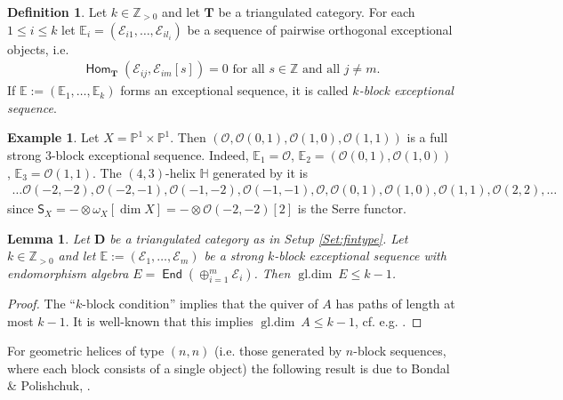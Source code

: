 \documentclass[a4paper,11pt, reqno]{amsart}
\def\E{\mathbb E}
\def\H{\mathbb H}
\def\P{\mathbb P}
\def\Z{\mathbb Z}
\def\DD{\mathbf D}
\def\OO{\mathcal O}
\def\TT{\mathbf T}
\def\sE{\mathscr{E}}
\def\gldim{{\operatorname{gl.dim}\ }}
\newcommand{\opname}[1]{\operatorname{\mathsf{#1}}}
\newcommand{\Hom}{\opname{Hom}}
\newcommand{\End}{\opname{End}}
\newcommand{\bS}{\mathsf{S}}
\theoremstyle{plain}
\newtheorem{lemma}[dummy]{Lemma}
\theoremstyle{definition}
\newtheorem{example}[dummy]{Example}
\newtheorem{definition}[dummy]{Definition}
\numberwithin{equation}{section}
\begin{document}
\begin{definition} \label{D:d-block exceptional sequence}
    Let $k \in \Z_{>0}$ and let $\TT$ be a triangulated category. For each $1 \leq i \leq k$ let $\E_i=(\sE_{i1}, \ldots, \sE_{il_i})$ be a sequence of pairwise orthogonal exceptional objects, i.e. 
    \begin{align}
        \Hom_\TT(\sE_{ij}, \sE_{im}[s])=0 \text{ for all }  s \in \Z \text{ and all } j\neq m.
    \end{align}
 If $\E:=(\E_1, \ldots, \E_k)$ forms an exceptional sequence, it is called \emph{$k$-block exceptional sequence}. 
  \end{definition}

\begin{example}\label{ex:p1xp1}
    Let $X=\P^1 \times \P^1$. Then $\left(\OO, \OO(0, 1), \OO(1, 0), \OO(1, 1)\right)$ is a full strong $3$-block exceptional sequence. Indeed, $\E_1=\OO$, $\E_2=(\OO(0, 1), \OO(1, 0))$, $\E_3=\OO(1, 1)$. The $(4, 3)$-helix $\H$ generated by it is
    \begin{align}
        \ldots \OO(-2, -2), \OO(-2, -1), \OO(-1, -2), \OO(-1, -1), \OO, \OO(0, 1), \OO(1, 0), \OO(1, 1), \OO(2, 2), \ldots 
    \end{align}
    since $\bS_X=- \otimes \omega_X [\dim X]=- \otimes \mathcal{O}(-2,-2)[2]$ is the Serre functor. 
\end{example}

\begin{lemma}\label{L:dblockgldim}
Let $\DD$ be a triangulated category as in Setup \ref{Set:fintype}.
    Let $k \in \Z_{>0}$ and let $\E:=(\sE_1, \ldots, \sE_m)$ be a strong $k$-block exceptional sequence with endomorphism algebra $E=\End(\oplus_{i=1}^m \sE_i)$. Then $\gldim E \leq k-1$.
\end{lemma}
\begin{proof}
    The ``$k$-block condition'' implies that the quiver of $A$ has paths of length at most $k-1$. It is well-known that this implies $\gldim A \leq k-1$, cf. e.g. \cite[Corollary 2.17]{HuberKalck}.
\end{proof}

For geometric helices of type $(n, n)$ (i.e. those generated by $n$-block sequences, where each block consists of a single object) the following result is due to Bondal \& Polishchuk, \cite{bondal-polishchuk}. 
\end{document}
